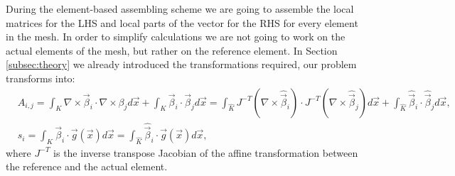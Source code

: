 During the element-based assembling scheme we are going to assemble the local matrices for the LHS and local parts of the vector for the RHS for every element in the mesh. In order to simplify calculations we are not going to work on the actual elements of the mesh, but rather on the reference element. In Section \ref{subsec:theory} we already introduced the transformations required, our problem transforms into:
\begin{align}
    & A_{i,j} = \int_{K} \nabla \times \vec \beta_i \cdot \nabla \times \beta_j d\vec x  + \int_{K} \vec \beta_i \cdot \vec \beta_j d\vec x = \int_{\hat K} J^{-T}(\nabla \times \hat{\vec\beta}_i) \cdot J^{-T} (\nabla \times \hat{\vec\beta}_j) d\vec x + \int_{\hat K} \hat{\vec\beta}_i \cdot \hat{\vec\beta}_j d\vec x \text{,}\\
    & s_{i} = \int_{K} \vec \beta_i \cdot \vec g(\vec x) d\vec x = \int_{\hat K} \hat{\vec\beta}_i \cdot \vec g(\vec x) d\vec x \text{,}
\end{align}
where $J^{-T}$ is the inverse transpose Jacobian of the affine transformation between the reference and the actual element.\medskip


